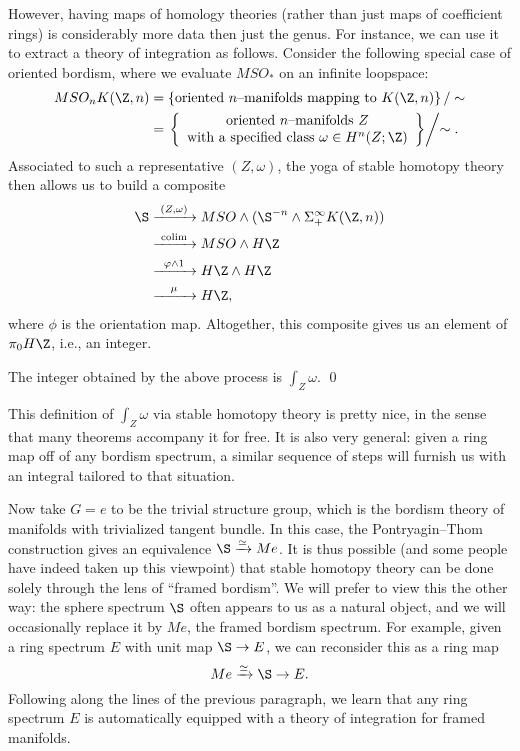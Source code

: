 However, having maps of homology theories (rather than just maps of coefficient rings) is considerably more data then just the genus.  For instance, we can use it to extract a theory of integration as follows.  Consider the following special case of oriented bordism, where we evaluate $MSO_*$ on an infinite loopspace:
\begin{align*}
MSO_n K(\Z, n) & = \left\{ \text{oriented $n$--manifolds mapping to $K(\Z, n)$} \right\} / \sim \\
& = \left. \left\{ \begin{array}{c}\text{oriented $n$--manifolds $Z$} \\ \text{with a specified class $\omega \in H^n(Z; \Z)$} \end{array}\right\} \middle/ \sim \right. .
\end{align*}
Associated to such a representative $(Z, \omega)$, the yoga of stable homotopy theory then allows us to build a composite
\begin{align*}
\S & \xrightarrow{\mathmakebox[2.5em]{(Z, \omega)}} MSO \sm (\S^{-n} \sm \Susp^\infty_+ K(\Z, n)) \\ 
& \xrightarrow{\mathmakebox[2.5em]{\colim}} MSO \sm H\Z \\
& \xrightarrow{\mathmakebox[2.5em]{\phi \sm 1}} H\Z \sm H\Z \\
& \xrightarrow{\mathmakebox[2.5em]{\mu}} H\Z,
\end{align*}
where $\phi$ is the orientation map.  Altogether, this composite gives us an element of $\pi_0 H\Z$, i.e., an integer.

\begin{lemma}
The integer obtained by the above process is $\int_Z \omega$. \qed
\end{lemma}

\noindent This definition of $\int_Z \omega$ via stable homotopy theory is pretty nice, in the sense that many theorems accompany it for free.  It is also very general: given a ring map off of any bordism spectrum, a similar sequence of steps will furnish us with an integral tailored to that situation.

Now take $G = e$ to be the trivial structure group, which is the bordism theory of manifolds with trivialized tangent bundle.  In this case, the Pontryagin--Thom construction gives an equivalence $\S \xrightarrow{\simeq} Me$.  It is thus possible (and some people have indeed taken up this viewpoint) that stable homotopy theory can be done solely through the lens of ``framed bordism''.  We will prefer to view this the other way: the sphere spectrum $\S$ often appears to us as a natural object, and we will occasionally replace it by $Me$, the framed bordism spectrum.  For example, given a ring spectrum $E$ with unit map $\S \to E$, we can reconsider this as a ring map \[Me \xrightarrow{\simeq} \S \to E.\]  Following along the lines of the previous paragraph, we learn that any ring spectrum $E$ is automatically equipped with a theory of integration for framed manifolds.

